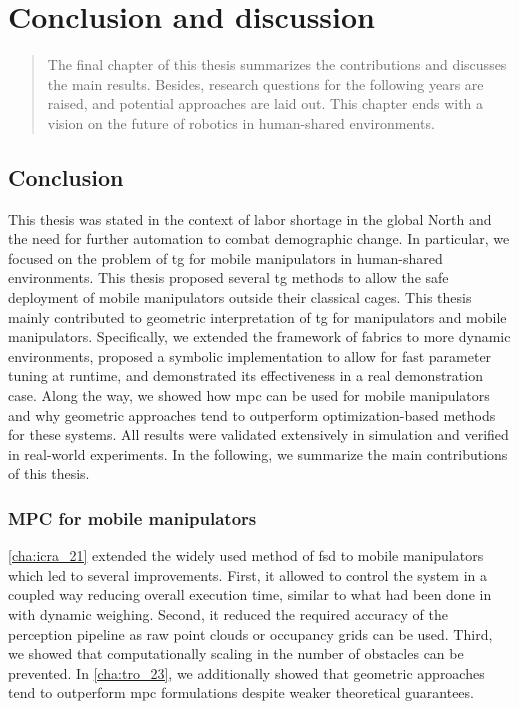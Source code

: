 \chapter{Conclusion and discussion}
\label{cha:conclusion}

\begin{abstract}
The final chapter of this thesis summarizes the
contributions and discusses the main results. Besides,
research questions for the following years are raised, and
potential approaches are laid out. This chapter ends with
a vision on the future of robotics in human-shared
environments.
\end{abstract}

\newpage

\section{Conclusion}
\label{sec:conclusion}

This thesis was stated in the context of labor shortage in the global North and
the need for further automation to combat demographic change. In particular, we
focused on the problem of \ac{tg} for mobile manipulators in human-shared
environments. This thesis proposed several \ac{tg} methods to allow the safe
deployment of mobile manipulators outside their classical cages.
This thesis mainly contributed to geometric interpretation of \ac{tg} for
manipulators and mobile manipulators. Specifically, we extended the framework of
\ac{fabrics} to more dynamic environments, proposed a symbolic implementation to
allow for fast parameter tuning at runtime, and demonstrated its effectiveness
in a real demonstration case. Along the way, we showed how \ac{mpc} can be used
for mobile manipulators and why geometric approaches tend to outperform
optimization-based methods for these systems. All results were validated
extensively in simulation and verified in real-world experiments. In the
following, we summarize the main contributions of this thesis.

\subsection{MPC for mobile manipulators}
\label{sec:conclusion_mpc}

\cref{cha:icra_21} extended the widely used method of \ac{fsd} to mobile
manipulators which led to several improvements. First, it allowed to control
the system in a coupled way reducing overall execution time, similar to what had
been done in \cite{Avanzini2018} with dynamic weighing. Second, it reduced the
required accuracy of the perception pipeline as raw point clouds or occupancy
grids can be used. Third, we showed that computationally scaling in the number
of obstacles can be prevented. In \cref{cha:tro_23},
we additionally showed that geometric approaches tend to outperform \ac{mpc}
formulations despite weaker theoretical guarantees.

